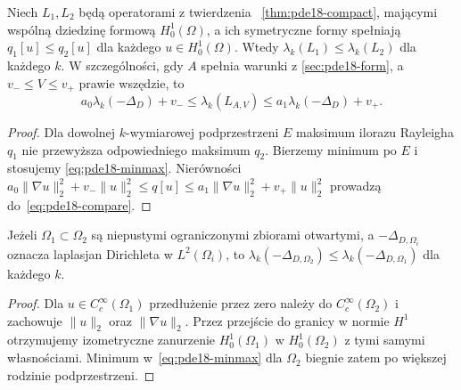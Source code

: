 \begin{wniosek}
\label{cor:pde18-compare}
Niech $L_1,L_2$ będą operatorami z twierdzenia
~\ref{thm:pde18-compact}, mającymi wspólną dziedzinę formową
$H_0^1(\Omega)$, a ich symetryczne formy spełniają
$q_1[u]\le q_2[u]$ dla każdego $u\in H_0^1(\Omega)$.
Wtedy $\lambda_k(L_1)\le\lambda_k(L_2)$ dla każdego $k$.
W szczególności, gdy $A$ spełnia warunki z
\ref{sec:pde18-form}, a $v_-\le V\le v_+$ prawie wszędzie,
to
\begin{equation}\label{eq:pde18-compare}
 a_0\lambda_k(-\Delta_D)+v_-
 \le\lambda_k(L_{A,V})\le
 a_1\lambda_k(-\Delta_D)+v_+.
\end{equation}
\end{wniosek}
\begin{proof}
Dla dowolnej $k$-wymiarowej podprzestrzeni $E$ maksimum
ilorazu Rayleigha $q_1$ nie przewyższa odpowiedniego maksimum
$q_2$. Bierzemy minimum po $E$ i stosujemy
\eqref{eq:pde18-minmax}. Nierówności
$a_0\|\nabla u\|_2^2+v_-\|u\|_2^2\le q[u]
\le a_1\|\nabla u\|_2^2+v_+\|u\|_2^2$
prowadzą do~\eqref{eq:pde18-compare}.
\end{proof}

\begin{wniosek}
\label{cor:pde18-domain}
Jeżeli $\Omega_1\subset\Omega_2$ są niepustymi ograniczonymi
zbiorami otwartymi,
a $-\Delta_{D,\Omega_i}$ oznacza laplasjan Dirichleta
w $L^2(\Omega_i)$, to
$\lambda_k(-\Delta_{D,\Omega_2})\le
\lambda_k(-\Delta_{D,\Omega_1})$ dla każdego $k$.
\end{wniosek}
\begin{proof}
Dla $u\in C_c^\infty(\Omega_1)$ przedłużenie przez zero
należy do $C_c^\infty(\Omega_2)$ i zachowuje
$\|u\|_2$ oraz $\|\nabla u\|_2$. Przez przejście
do granicy w normie $H^1$ otrzymujemy izometryczne
zanurzenie $H_0^1(\Omega_1)$ w $H_0^1(\Omega_2)$
z tymi samymi własnościami.
Minimum w~\eqref{eq:pde18-minmax} dla $\Omega_2$
biegnie zatem po większej rodzinie podprzestrzeni.
\end{proof}

